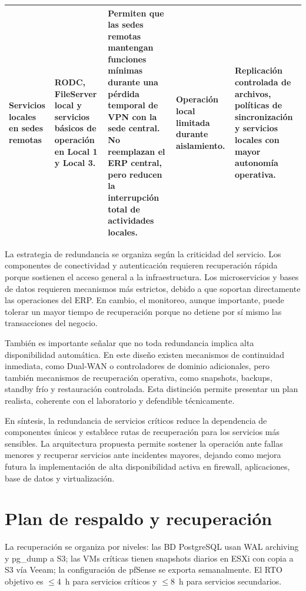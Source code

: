 \documentclass[11pt, a4paper, oneside]{report}
\begin{document}
\begin{landscape}
\begin{xltabular}{\linewidth}{@{}|L{3cm}|L{4cm}|L{5.7cm}|L{3.1cm}|X|@{}}
{\small Servicios locales en sedes remotas} &
{\small RODC, FileServer local y servicios básicos de operación en Local 1 y Local 3.} &
{\small Permiten que las sedes remotas mantengan funciones mínimas durante una pérdida temporal de VPN con la sede central. No reemplazan el ERP central, pero reducen la interrupción total de actividades locales.} &
{\small Operación local limitada durante aislamiento.} &
{\small Replicación controlada de archivos, políticas de sincronización y servicios locales con mayor autonomía operativa.} \\ \hline

\end{xltabular}

\normalsize
\end{landscape}

La estrategia de redundancia se organiza según la criticidad del servicio. Los componentes de conectividad y autenticación requieren recuperación rápida porque sostienen el acceso general a la infraestructura. Los microservicios y bases de datos requieren mecanismos más estrictos, debido a que soportan directamente las operaciones del ERP. En cambio, el monitoreo, aunque importante, puede tolerar un mayor tiempo de recuperación porque no detiene por sí mismo las transacciones del negocio.

También es importante señalar que no toda redundancia implica alta disponibilidad automática. En este diseño existen mecanismos de continuidad inmediata, como Dual-WAN o controladores de dominio adicionales, pero también mecanismos de recuperación operativa, como snapshots, backups, standby frío y restauración controlada. Esta distinción permite presentar un plan realista, coherente con el laboratorio y defendible técnicamente.

En síntesis, la redundancia de servicios críticos reduce la dependencia de componentes únicos y establece rutas de recuperación para los servicios más sensibles. La arquitectura propuesta permite sostener la operación ante fallas menores y recuperar servicios ante incidentes mayores, dejando como mejora futura la implementación de alta disponibilidad activa en firewall, aplicaciones, base de datos y virtualización.

\section{Plan de respaldo y recuperación}

La recuperación se organiza por niveles: las BD PostgreSQL usan WAL archiving y pg\_dump a S3; las VMs críticas tienen snapshots diarios en ESXi con copia a S3 vía Veeam; la configuración de pfSense se exporta semanalmente. El RTO objetivo es $\leq 4$~h para servicios críticos y $\leq 8$~h para servicios secundarios.
\end{document}
